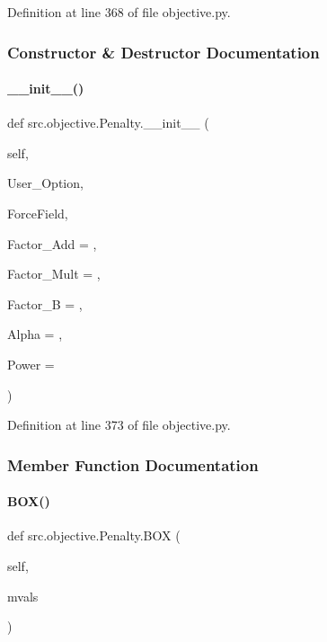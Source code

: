Definition at line 368 of file objective.\+py.



\subsubsection{Constructor \& Destructor Documentation}
\mbox{\label{classsrc_1_1objective_1_1Penalty_acea9117e2aa54b3b6fed9a86d53fbe96}} 
\paragraph{\texorpdfstring{\+\_\+\+\_\+init\+\_\+\+\_\+()}{\_\_init\_\_()}}
{\footnotesize\ttfamily def src.\+objective.\+Penalty.\+\_\+\+\_\+init\+\_\+\+\_\+ (\begin{DoxyParamCaption}\item[{}]{self,  }\item[{}]{User\+\_\+\+Option,  }\item[{}]{Force\+Field,  }\item[{}]{Factor\+\_\+\+Add = {},  }\item[{}]{Factor\+\_\+\+Mult = {},  }\item[{}]{Factor\+\_\+B = {},  }\item[{}]{Alpha = {},  }\item[{}]{Power = {} }\end{DoxyParamCaption})}



Definition at line 373 of file objective.\+py.



\subsubsection{Member Function Documentation}
\mbox{\label{classsrc_1_1objective_1_1Penalty_a673bdca43bc69b1275fe96e235d3dc0b}} 
\paragraph{\texorpdfstring{B\+O\+X()}{BOX()}}
{\footnotesize\ttfamily def src.\+objective.\+Penalty.\+B\+OX (\begin{DoxyParamCaption}\item[{}]{self,  }\item[{}]{mvals }\end{DoxyParamCaption})}




